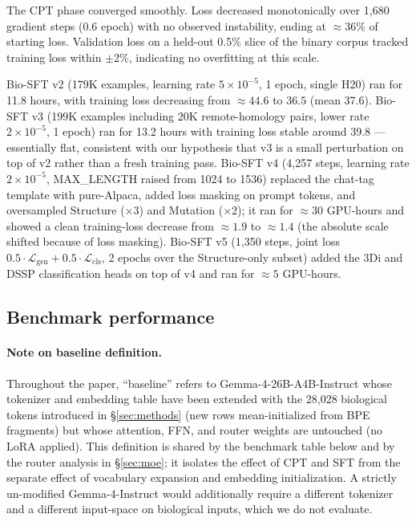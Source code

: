 \documentclass[11pt]{article}
\begin{document}
The CPT phase converged smoothly. Loss decreased monotonically over 1{,}680 gradient steps (0.6 epoch) with no observed instability, ending at $\approx 36\%$ of starting loss. Validation loss on a held-out 0.5\% slice of the binary corpus tracked training loss within $\pm 2\%$, indicating no overfitting at this scale.

Bio-SFT v2 (179K examples, learning rate $5 \times 10^{-5}$, 1 epoch, single H20) ran for 11.8 hours, with training loss decreasing from $\approx 44.6$ to $36.5$ (mean 37.6). Bio-SFT v3 (199K examples including 20K remote-homology pairs, lower rate $2 \times 10^{-5}$, 1 epoch) ran for 13.2 hours with training loss stable around 39.8 --- essentially flat, consistent with our hypothesis that v3 is a small perturbation on top of v2 rather than a fresh training pass. Bio-SFT v4 (4{,}257 steps, learning rate $2 \times 10^{-5}$, MAX\_LENGTH raised from 1024 to 1536) replaced the chat-tag template with pure-Alpaca, added loss masking on prompt tokens, and oversampled Structure ($\times 3$) and Mutation ($\times 2$); it ran for $\approx 30$ GPU-hours and showed a clean training-loss decrease from $\approx 1.9$ to $\approx 1.4$ (the absolute scale shifted because of loss masking). Bio-SFT v5 (1{,}350 steps, joint loss $0.5 \cdot \mathcal{L}_{\text{gen}} + 0.5 \cdot \mathcal{L}_{\text{cls}}$, 2 epochs over the Structure-only subset) added the 3Di and DSSP classification heads on top of v4 and ran for $\approx 5$ GPU-hours.

\subsection{Benchmark performance}
\label{sec:benchmarks}

\paragraph{Note on baseline definition.} Throughout the paper, ``baseline'' refers to Gemma-4-26B-A4B-Instruct whose tokenizer and embedding table have been extended with the 28{,}028 biological tokens introduced in \S\ref{sec:methods} (new rows mean-initialized from BPE fragments) but whose attention, FFN, and router weights are untouched (no LoRA applied). This definition is shared by the benchmark table below and by the router analysis in \S\ref{sec:moe}; it isolates the effect of CPT and SFT from the separate effect of vocabulary expansion and embedding initialization. A strictly un-modified Gemma-4-Instruct would additionally require a different tokenizer and a different input-space on biological inputs, which we do not evaluate.
\end{document}
